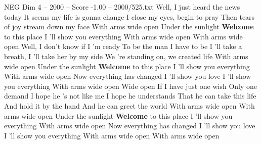 \begin{textsample}{NEG Dim 4 – 2000 – Score -1.00 – 2000/525.txt}  \label{ex:f4_neg_038}
Well, I just heard the news today It seems my life is gonna change I close my eyes, begin to pray Then tears of joy stream down my face With arms wide open Under the sunlight \textbf{Welcome} to this place I 'll show you everything With arms wide open With arms wide open Well, I don't know if I 'm ready To be the man I have to be I 'll take a breath, I 'll take her by my side We 're standing on, we created life With arms wide open Under the sunlight \textbf{Welcome} to this place I 'll show you everything With arms wide open Now everything has changed I 'll show you love I 'll show you everything With arms wide open Wide open If I have just one wish Only one demand I hope he 's not like me I hope he understands That he can take this life And hold it by the hand And he can greet the world With arms wide open With arms wide open Under the sunlight \textbf{Welcome} to this place I 'll show you everything With arms wide open Now everything has changed I 'll show you love I 'll show you everything With arms wide open With arms wide open

\end{textsample}
